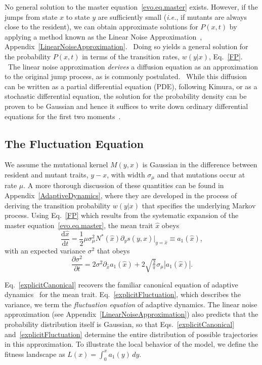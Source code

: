 No general solution to the master equation~\eqref{evo.eq.master} exists.
However, if the jumps from state $x$ to state $y$ are sufficiently small
(\emph{i.e.}, if mutants are always close to the resident), we can obtain approximate
solutions for $P(x,t)$ by applying a method known as the Linear Noise
Approximation~\citep{vankampen_book2001},
Appendix~\ref{LinearNoiseApproximation}.  Doing so yields
a general solution for the probability $P(x,t)$ in terms of the transition
rates, $w(y|x)$, Eq.~\eqref{FP}.  The linear noise approximation
\emph{derives} a diffusion equation as an approximation
to the original jump process, as is commonly postulated.  While this diffusion
can be written as a partial differential equation (PDE), following Kimura, or
as a stochastic differential equation, the solution for the probability density
can be proven to be Gaussian and hence it suffices to write down ordinary
differential equations for the first two moments~\citep{kurtz_1971}.


 
\subsection{The Fluctuation Equation}
 
We assume the mutational kernel $M(y,x)$ is Gaussian in the difference between 
resident and mutant traits, $y-x$, with width $\sigma_{\mu}$ and that mutations 
occur at rate $\mu$.   A more thorough discussion of these quantities can be 
found in Appendix~\ref{AdaptiveDynamics}, where they are developed in the process 
of deriving the transition probability $w(y|x)$ that specifies the underlying 
Markov process.  Using Eq.~\eqref{FP} which results from the systematic expansion 
of the master equation~\eqref{evo.eq.master}, the mean trait $\hat x$ obeys 
\begin{equation}
\frac{\mathrm{d} \hat x}{\mathrm{d} t} = \frac{1}{2}\mu \sigma_{\mu}^2 N^*(\hat x) \partial_y s(y, \hat x)|_{y=\hat x} \equiv a_{1}(\hat x), \label{explicitCanonical}
\end{equation}
with an expected variance $\sigma^2$ that obeys 
\begin{equation}
\frac{\partial \sigma^2}{\partial t} = 2 \sigma^2 \partial_{\hat x} a_{1}(\hat x) + 2\sqrt{\tfrac{2}{\pi} }\sigma_{\mu} \left|a_1(\hat x) \right| \label{explicitFluctuation} .
\end{equation}
 
Eq.~\eqref{explicitCanonical} recovers the familiar canonical equation of adaptive 
dynamics~\citep{dieckmann_jmb1996} for the mean trait.   
Eq.~\eqref{explicitFluctuation}, which describes the variance, we term the 
\emph{fluctuation equation} of adaptive dynamics.    The linear
noise approximation (see Appendix~\ref{LinearNoiseApproximation}) also 
predicts that the probability distribution itself is Gaussian, so that 
Eqs.~\eqref{explicitCanonical} and~\eqref{explicitFluctuation}
determine the entire distribution of possible trajectories in this approximation.  To illustrate the local behavior of the model, we define the fitness
landscape as $L(x) = \int_0^x a_1(y)\,dy$.

